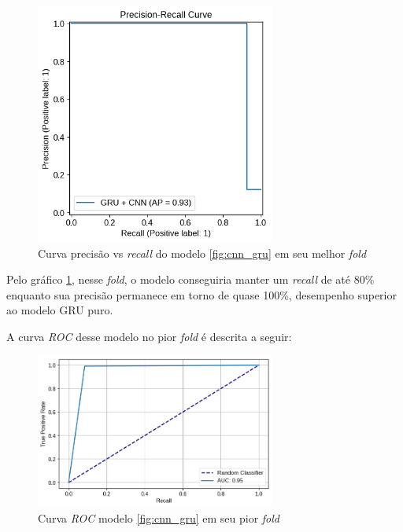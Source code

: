 \documentclass[
    12pt,                %
    openright,           %
    oneside,             %
    a4paper,             %
    brazil               %
]{abntex2}
\begin{document}
\begin{figure}[H]
  \centering
   \includegraphics[width=0.7\textwidth]{figuras/modelos_resultados/gru_cnn/ap_gru_cnn_melhor_fold_1.png} 
  \caption{Curva precisão vs \textit{recall} do modelo \ref{fig:cnn_gru} em seu melhor \textit{fold}}
  \label{fig:ap_cnn_gru_melhor_fold}
\end{figure}

Pelo gráfico \ref{fig:ap_cnn_gru_melhor_fold}, nesse \textit{fold}, o modelo conseguiria manter um \textit{recall} de até 80\%
enquanto sua precisão permanece em torno de quase 100\%, desempenho superior ao modelo GRU puro.

A curva \textit{ROC} desse modelo no pior \textit{fold} é descrita a seguir:

\begin{figure}[H]
  \centering
   \includegraphics[width=0.7\textwidth]{figuras/modelos_resultados/gru_cnn/roc_cnn_pior_fold_3.png} 
  \caption{Curva \textit{ROC} modelo \ref{fig:cnn_gru} em seu pior \textit{fold}}
  \label{fig:roc_cnn_gru_pior_fold}
\end{figure}
\end{document}
